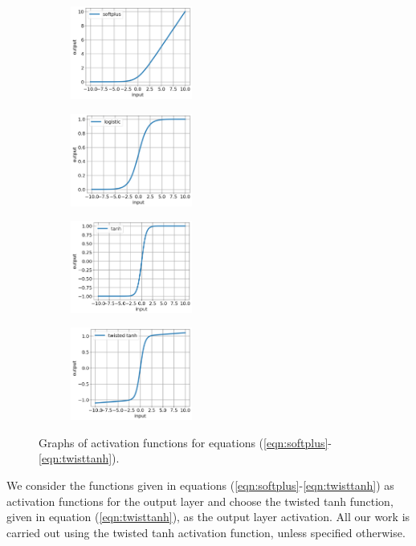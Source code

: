\documentclass[10pt]{article}
\newcommand{\nhghalfwidth}{0.48\linewidth}
\begin{document}
\begin{figure}[!h]
  \centering
  \begin{subfigure}[t]{\nhghalfwidth}
    \centering
    \includegraphics[width=4cm]{Figures/scripts/softplus.png}
  \end{subfigure}
  \begin{subfigure}[t]{\nhghalfwidth}
    \centering
    \includegraphics[width=4cm]{Figures/scripts/logistic.png}
  \end{subfigure}
  \begin{subfigure}[t]{\nhghalfwidth}
    \centering   
    \includegraphics[width=4cm]{Figures/scripts/tanh.png}
  \end{subfigure}
  \begin{subfigure}[t]{\nhghalfwidth}
    \centering
    \includegraphics[width=4cm]{Figures/scripts/twistedtanh.png}
  \end{subfigure}
\caption{\label{fig:activations} Graphs of activation functions for equations (\ref{eqn:softplus}-\ref{eqn:twisttanh}).}
\end{figure}
%
We consider the functions given in equations (\ref{eqn:softplus}-\ref{eqn:twisttanh}) as activation functions for the output layer and choose the twisted tanh function, given in equation (\ref{eqn:twisttanh}), as the output layer activation. All our work is carried out using the twisted tanh activation function, unless specified otherwise.
\end{document}
